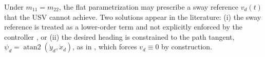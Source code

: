 \begin{remark}
Under $m_{11}=m_{22}$, the flat parametrization may prescribe a sway reference $v_d(t)$ that the USV cannot achieve. Two solutions appear in the literature: (i) the sway reference is treated as a lower-order term and not explicitly enforced by the controller \cite{Fang2024Symmetry}, or (ii) the desired heading is constrained to the path tangent, $\psi_d=\operatorname{atan2}(\dot y_d,\dot x_d)$, as in \cite{Wang2022Trajectory}, which forces $v_d\equiv0$ by construction.
\end{remark}

